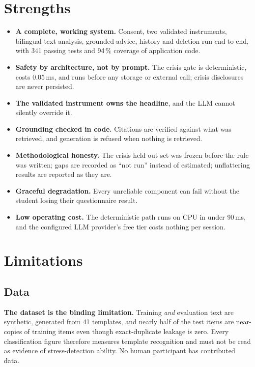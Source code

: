 \section{Strengths}
\begin{itemize}
	\item \textbf{A complete, working system.} Consent, two validated instruments, bilingual text analysis, grounded advice, history and deletion run end to end, with 341 passing tests and 94\,\% coverage of application code.
	\item \textbf{Safety by architecture, not by prompt.} The crisis gate is deterministic, costs 0.05\,ms, and runs before any storage or external call; crisis disclosures are never persisted.
	\item \textbf{The validated instrument owns the headline}, and the LLM cannot silently override it.
	\item \textbf{Grounding checked in code.} Citations are verified against what was retrieved, and generation is refused when nothing is retrieved.
	\item \textbf{Methodological honesty.} The crisis held-out set was frozen before the rule was written; gaps are recorded as ``not run'' instead of estimated; unflattering results are reported as they are.
	\item \textbf{Graceful degradation.} Every unreliable component can fail without the student losing their questionnaire result.
	\item \textbf{Low operating cost.} The deterministic path runs on CPU in under 90\,ms, and the configured LLM provider's free tier costs nothing per session.
\end{itemize}

\section{Limitations}
\label{sec:limitations}

\subsection{Data}
\textbf{The dataset is the binding limitation.} Training \textit{and} evaluation text are synthetic, generated from 41 templates, and nearly half of the test items are near-copies of training items even though exact-duplicate leakage is zero. Every classification figure therefore measures template recognition and must not be read as evidence of stress-detection ability. No human participant has contributed data.


